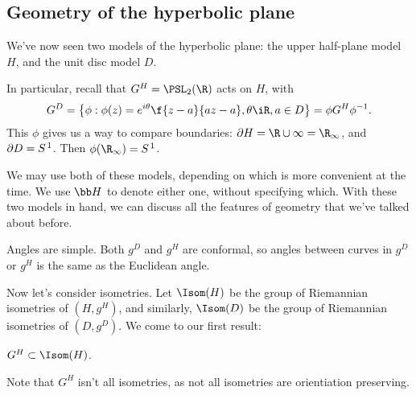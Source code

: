 

\subsection{Geometry of the hyperbolic plane} %
\label{sub:geometry_of_the_hyperbolic_plane}

We've now seen two models of the hyperbolic plane: the upper half-plane model $H$, and the unit disc model $D$.

In particular, recall that $G^H = \PSL_2(\R)$ acts on $H$, with
\begin{equation*}
	G^D = \left\{\phi: \phi(z) = e^{i\theta} \f{z-a}{az-a}, \theta\iR, a\in D\right\} = \phi G^H \phi^{-1}.
\end{equation*}
This $\phi$ gives us a way to compare boundaries: $\boundary{H} = \R\cup\infty=\R_\infty$, and $\partial{D} =S^{\,1}$. Then $\phi(\R_\infty) = S^{\,1}$.

We may use both of these models, depending on which is more convenient at the time. We use $\HH$ to denote either one, without specifying which. With these two models in hand, we can discuss all the features of geometry that we've talked about before.

Angles are simple. Both $g^D$ and $g^H$ are conformal, so angles between curves in $g^D$ or $g^H$ is the same as the Euclidean angle.

Now let's consider isometries. Let $\Isom(H)$ be the group of Riemannian isometries of $(H,g^H)$, and similarly, $\Isom(D)$ be the group of Riemannian isometries of $(D,g^D)$. We come to our first result:

\begin{proposition}
	$G^H \subset \Isom(H)$.
\end{proposition}

\vspace{-8pt}

Note that $G^H$ isn't all isometries, as not all isometries are orientiation preserving.

